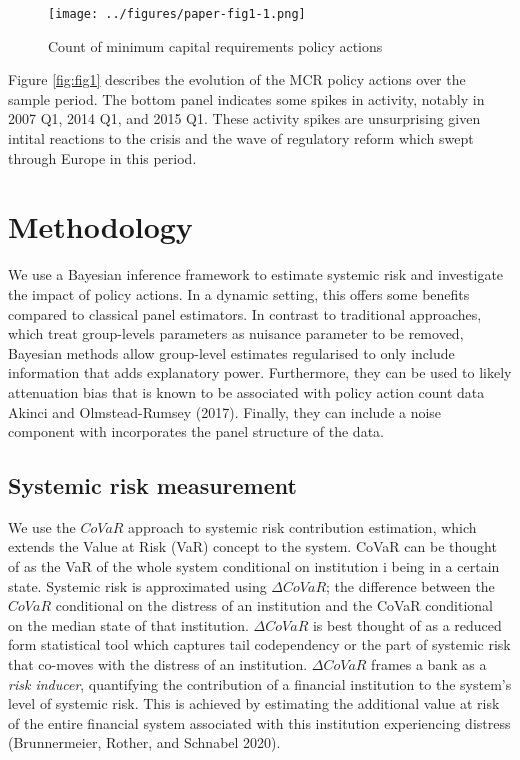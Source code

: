 \documentclass[
  10pt,
]{article}
\begin{document}
\begin{figure}
\centering
\texttt{[image: ../figures/paper-fig1-1.png]}
\caption{Count of minimum capital requirements policy actions}
\end{figure}

Figure \ref{fig:fig1} describes the evolution of the MCR policy actions
over the sample period. The bottom panel indicates some spikes in
activity, notably in 2007 Q1, 2014 Q1, and 2015 Q1. These activity
spikes are unsurprising given intital reactions to the crisis and the
wave of regulatory reform which swept through Europe in this period.

\hypertarget{meth}{%
\section{Methodology}\label{meth}}

We use a Bayesian inference framework to estimate systemic risk and
investigate the impact of policy actions. In a dynamic setting, this
offers some benefits compared to classical panel estimators. In contrast
to traditional approaches, which treat group-levels parameters as
nuisance parameter to be removed, Bayesian methods allow group-level
estimates regularised to only include information that adds explanatory
power. Furthermore, they can be used to likely attenuation bias that is
known to be associated with policy action count data Akinci and
Olmstead-Rumsey (2017). Finally, they can include a noise component with
incorporates the panel structure of the data.

\hypertarget{systemic-risk-measurement}{%
\subsection{Systemic risk measurement}\label{systemic-risk-measurement}}

We use the \(CoVaR\) approach to systemic risk contribution estimation,
which extends the Value at Risk (VaR) concept to the system. CoVaR can
be thought of as the VaR of the whole system conditional on institution
i being in a certain state. Systemic risk is approximated using
\(\Delta CoVaR\); the difference between the \(CoVaR\) conditional on
the distress of an institution and the CoVaR conditional on the median
state of that institution. \(\Delta CoVaR\) is best thought of as a
reduced form statistical tool which captures tail codependency or the
part of systemic risk that co-moves with the distress of an institution.
\(\Delta CoVaR\) frames a bank as a \emph{risk inducer}, quantifying the
contribution of a financial institution to the system's level of
systemic risk. This is achieved by estimating the additional value at
risk of the entire financial system associated with this institution
experiencing distress (Brunnermeier, Rother, and Schnabel 2020).
\end{document}
